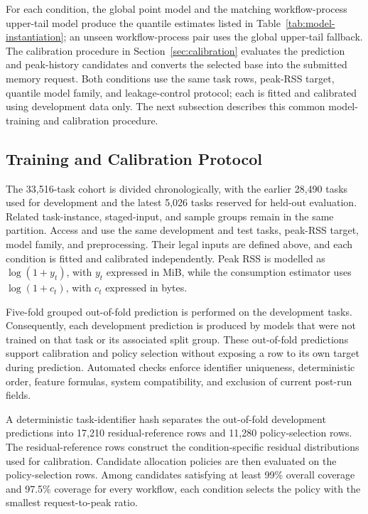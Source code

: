 For each condition, the global point model and the matching workflow-process
upper-tail model produce the quantile estimates listed in
Table~\ref{tab:model-instantiation}; an unseen workflow-process pair uses the
global upper-tail fallback. The calibration procedure in
Section~\ref{sec:calibration} evaluates the prediction and peak-history
candidates and converts the selected base into the submitted memory request.
Both conditions use the same task rows, peak-RSS target, quantile model family,
and leakage-control protocol; each is fitted and calibrated using development
data only. The next subsection describes this common model-training and
calibration procedure.

  \subsection{Training and Calibration Protocol}

The 33,516-task cohort is divided chronologically, with the earlier 28,490
tasks used for development and the latest 5,026 tasks reserved for held-out
evaluation. Related task-instance, staged-input, and sample groups remain in
the same partition. Access and \toolname use the same development and test tasks,
peak-RSS target, model family, and preprocessing. Their legal inputs are defined
above, and each condition is fitted and calibrated independently. Peak RSS is
modelled as $\log(1+y_t)$, with $y_t$ expressed in MiB, while the consumption
estimator uses $\log(1+c_t)$, with $c_t$ expressed in bytes.

Five-fold grouped out-of-fold prediction is performed on the development
tasks. Consequently, each development prediction is produced by models that
were not trained on that task or its associated split group. These out-of-fold
predictions support calibration and policy selection without exposing a row to
its own target during prediction. Automated checks enforce identifier
uniqueness, deterministic order, feature formulas, system compatibility, and
exclusion of current post-run fields.

A deterministic task-identifier hash separates the out-of-fold development
predictions into 17,210 residual-reference rows and 11,280 policy-selection
rows. The residual-reference rows construct the condition-specific residual
distributions used for calibration. Candidate allocation policies are then
evaluated on the policy-selection rows. Among candidates satisfying at
least 99\% overall coverage and 97.5\% coverage for every workflow, each
condition selects the policy with the smallest request-to-peak ratio.


